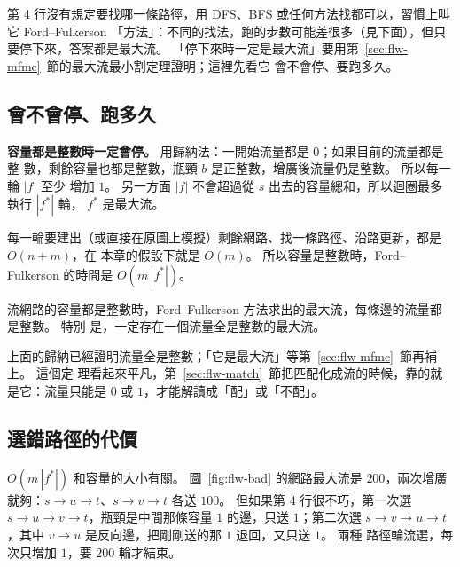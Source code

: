 第 4 行沒有規定要找哪一條路徑，用 DFS、BFS 或任何方法找都可以，習慣上叫它 Ford--Fulkerson
「方法」：不同的找法，跑的步數可能差很多（見下面），但只要停下來，答案都是最大流。
「停下來時一定是最大流」要用第~\ref{sec:flw-mfmc}~節的最大流最小割定理證明；這裡先看它
會不會停、要跑多久。

\subsection{會不會停、跑多久}

\textbf{容量都是整數時一定會停。} 用歸納法：一開始流量都是 $0$；如果目前的流量都是整
數，剩餘容量也都是整數，瓶頸 $b$ 是正整數，增廣後流量仍是整數。 所以每一輪 $|f|$ 至少
增加 $1$。 另一方面 $|f|$ 不會超過從 $s$ 出去的容量總和，所以迴圈最多執行 $|f^{*}|$ 輪，
$f^{*}$ 是最大流。

每一輪要建出（或直接在原圖上模擬）剩餘網路、找一條路徑、沿路更新，都是 $O(n + m)$，在
本章的假設下就是 $O(m)$。 所以容量是整數時，Ford--Fulkerson 的時間是 $O(m\,|f^{*}|)$。

\begin{theorem}[整數性]
\label{thm:flw-integral}
流網路的容量都是整數時，Ford--Fulkerson 方法求出的最大流，每條邊的流量都是整數。 特別
是，一定存在一個流量全是整數的最大流。
\end{theorem}

上面的歸納已經證明流量全是整數；「它是最大流」等第~\ref{sec:flw-mfmc}~節再補上。 這個定
理看起來平凡，第~\ref{sec:flw-match}~節把匹配化成流的時候，靠的就是它：流量只能是 $0$
或 $1$，才能解讀成「配」或「不配」。

\subsection{選錯路徑的代價}
\label{sec:flw-bad}

$O(m\,|f^{*}|)$ 和容量的大小有關。 圖~\ref{fig:flw-bad} 的網路最大流是 $200$，兩次增廣
就夠：$s \to u \to t$、$s \to v \to t$ 各送 $100$。 但如果第 4 行很不巧，第一次選
$s \to u \to v \to t$，瓶頸是中間那條容量 $1$ 的邊，只送 $1$；第二次選
$s \to v \to u \to t$，其中 $v \to u$ 是反向邊，把剛剛送的那 $1$ 退回，又只送 $1$。 兩種
路徑輪流選，每次只增加 $1$，要 $200$ 輪才結束。

\begin{center}
\par\nopagebreak
{}
\label{fig:flw-bad}
\end{center}

